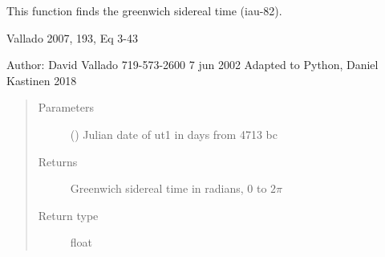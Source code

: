 \documentclass[letterpaper,10pt,english]{sphinxmanual}
\begin{document}
\begin{fulllineitems}
\label{\detokenize{modules/propagator_sgp4:propagator_sgp4.gstime}}
This function finds the greenwich sidereal time (iau-82).

 Vallado 2007, 193, Eq 3-43

Author: David Vallado 719-573-2600    7 jun 2002
Adapted to Python, Daniel Kastinen 2018
\begin{quote}\begin{description}
\item[{Parameters}] \leavevmode
{} () \textendash{} Julian date of ut1 in days from 4713 bc

\item[{Returns}] \leavevmode
Greenwich sidereal time in radians, 0 to \(2\pi\)

\item[{Return type}] \leavevmode
float

\end{description}\end{quote}

\end{fulllineitems}

\end{document}
